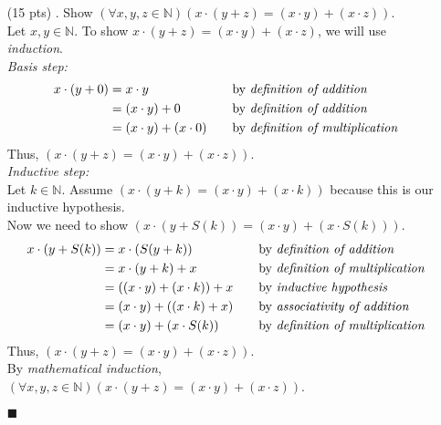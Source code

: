\documentclass[11pt,a4paper]{article}
\begin{document}
\begin{enumerate}
    \item[(15 pts) \quad 4.]
    Show $(\forall x, y, z \in \mathbb{N})(x \cdot (y + z) = (x \cdot y) + (x \cdot z)) $. \\
    Let $x, y \in \mathbb{N} $. To show $x \cdot (y + z) = (x \cdot y) + (x \cdot z) $, we will use \emph{induction}.\\
    \emph{Basis step:} 
    \begin{align*}
        x \cdot (y + 0)
            &= x \cdot y
                &\quad 
                &\text{by \emph{definition of addition}} \\
            &= (x \cdot y) + 0 
                &\quad
                &\text{by \emph{definition of addition}} \\
            &= (x \cdot y) + (x \cdot 0)
                &\quad
                &\text{by \emph{definition of multiplication}} 
    \end{align*} 
    Thus, $(x \cdot (y + z) = (x \cdot y) + (x \cdot z)) $. \\
    \emph{Inductive step:} \\
    Let $k \in \mathbb{N} $. Assume $(x \cdot (y + k) = (x \cdot y) + (x \cdot k)) $ because this is our inductive hypothesis. \\
    Now we need to show $(x \cdot (y + S(k)) = (x \cdot y) + (x \cdot S(k))) $. 
    \begin{align*}
        x \cdot (y + S(k))
            &= x \cdot (S(y + k))
                &\quad
                &\text{by \emph{definition of addition}} \\
            &= x \cdot (y + k) + x
                &\quad
                &\text{by \emph{definition of multiplication}} \\
            &= ((x \cdot y) + (x \cdot k)) + x
                &\quad
                &\text{by \emph{inductive hypothesis}} \\
            &= (x \cdot y) + ((x \cdot k) + x)
                &\quad
                &\text{by \emph{associativity of addition}} \\
            &= (x \cdot y) + (x \cdot S(k)) 
                &\quad
                &\text{by \emph{definition of multiplication}}
    \end{align*}
    Thus, $(x \cdot (y + z) = (x \cdot y) + (x \cdot z)) $. \\
    By \emph{mathematical induction}, $(\forall x, y, z \in \mathbb{N})(x \cdot (y + z) = (x \cdot y) + (x \cdot z)) $.
    \begin{flushright}
        $\blacksquare$
    \end{flushright}
    


\end{enumerate}
\end{document}
